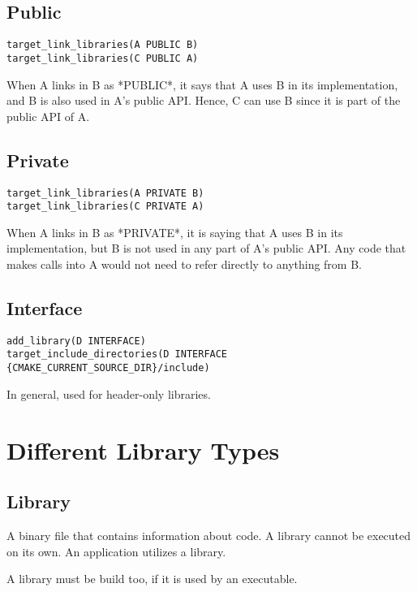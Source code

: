 \subsection{Public}

\begin{verbatim}
target_link_libraries(A PUBLIC B)
target_link_libraries(C PUBLIC A)
\end{verbatim}

When A links in B as *PUBLIC*, it says that A uses B in its implementation, and B is also used in A's public API. Hence, C can use B since it is part of the public API of A.

\subsection{Private}

\begin{verbatim}
target_link_libraries(A PRIVATE B)
target_link_libraries(C PRIVATE A)
\end{verbatim}


When A links in B as *PRIVATE*, it is saying that A uses B in its
implementation, but B is not used in any part of A's public API. Any code
that makes calls into A would not need to refer directly to anything from
B.

\subsection{Interface}

\begin{verbatim}
add_library(D INTERFACE)
target_include_directories(D INTERFACE {CMAKE_CURRENT_SOURCE_DIR}/include)
\end{verbatim}

In general, used for header-only libraries.

\section{Different Library Types}

\subsection{Library}

A binary file that contains information about code.
A library cannot be executed on its own.
An application utilizes a library.

A library must be build too, if it is used by an executable.

